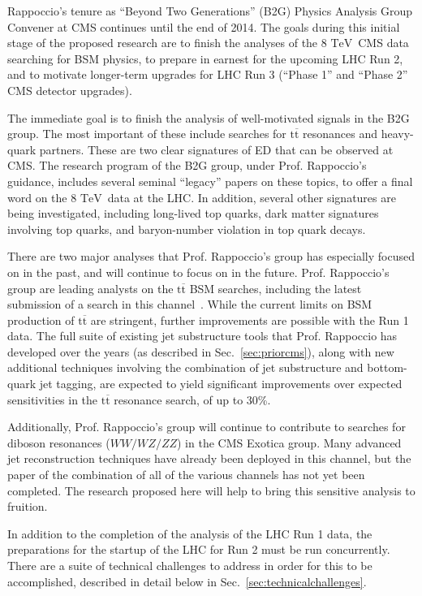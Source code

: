 \documentclass[12pt]{proposalnsf}
\newcommand{\TeV}{\ensuremath{\mathrm{TeV}}}
\newcommand{\ttbar}        {\ensuremath{\mathrm{t}\overline{\mathrm{t}}}}
\begin{document}
Rappoccio's tenure as ``Beyond Two Generations'' (B2G) Physics
Analysis Group Convener at CMS continues until the end of 2014. The
goals during this initial stage of the proposed research are to
finish the analyses of the 8 \TeV\ CMS data searching for BSM physics,
to prepare in earnest for the upcoming LHC Run 2, and to motivate
longer-term upgrades for LHC Run 3 (``Phase 1'' and ``Phase 2'' CMS
detector upgrades). 

The immediate goal is to finish the analysis of well-motivated signals
in the B2G group. The most important of these include searches for
$\ttbar$ resonances and heavy-quark partners. These are two clear
signatures of ED that can be observed at CMS. The research program of
the B2G group, under Prof. Rappoccio's guidance, includes several
seminal ``legacy'' papers on these topics, to offer a final word on
the 8 \TeV\ data at the LHC. In addition, several other signatures are
being investigated, including long-lived top quarks, dark matter
signatures involving top quarks, and baryon-number violation in top
quark decays. 

There are two major analyses that Prof. Rappoccio's group has
especially focused on in the past, and will continue to focus on in
the future. Prof. Rappoccio's group are 
leading analysts on the $\ttbar$ BSM searches, including the
latest submission of a search in this channel~\cite{B2G-13-001}.
While the current limits on BSM production of $\ttbar$ are stringent,
further improvements are possible with the Run 1 data. 
The full suite of existing jet substructure tools that
Prof. Rappoccio has developed over the years (as described in
Sec.~\ref{sec:priorcms}), along with new additional techniques involving
the combination
of jet substructure and bottom-quark jet tagging, are expected to
yield significant improvements over expected sensitivities in the
$\ttbar$ resonance search, of up to 30\%. 

Additionally, Prof. Rappoccio's group will continue to contribute to 
searches for diboson resonances ($WW/WZ/ZZ$) in the CMS Exotica
group. Many advanced jet reconstruction techniques have already been
deployed in this channel, but the paper of the combination of all of
the various channels has not yet been completed. The research proposed
here will help to bring this sensitive analysis to fruition. 



In addition to the completion of the analysis of the LHC Run 1 data,
the preparations for the startup of the LHC for Run 2 must be run
concurrently. There are a suite of technical challenges to address in
order for this to be accomplished, described in detail below in
Sec.~\ref{sec:technicalchallenges}. 
\end{document}
